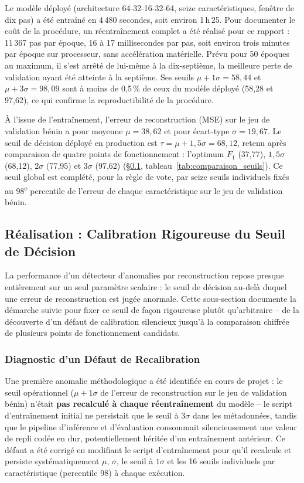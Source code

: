 Le modèle déployé (architecture 64-32-16-32-64, seize caractéristiques, fenêtre de dix pas) a été entraîné en 4\,480 secondes, soit environ 1\,h\,25. Pour documenter le coût de la procédure, un réentraînement complet a été réalisé pour ce rapport : 11\,367 pas par époque, 16 à 17 millisecondes par pas, soit environ trois minutes par époque sur processeur, sans accélération matérielle. Prévu pour 50 époques au maximum, il s'est arrêté de lui-même à la dix-septième, la meilleure perte de validation ayant été atteinte à la septième. Ses seuils $\mu+1\sigma = 58,44$ et $\mu+3\sigma = 98,09$ sont à moins de 0,5\,\% de ceux du modèle déployé (58,28 et 97,62), ce qui confirme la reproductibilité de la procédure.

À l'issue de l'entraînement, l'erreur de reconstruction (MSE) sur le jeu de validation bénin a pour moyenne $\mu = 38,62$ et pour écart-type $\sigma = 19,67$. Le seuil de décision déployé en production est $\tau = \mu + 1,5\sigma = 68,12$, retenu après comparaison de quatre points de fonctionnement : l'optimum $F_1$ (37,77), $1,5\sigma$ (68,12), $2\sigma$ (77,95) et $3\sigma$ (97,62) (\S\ref{subsec:threshold_scaling}, tableau~\ref{tab:comparaison_seuils}). Ce seuil global est complété, pour la règle de vote, par seize seuils individuels fixés au 98\textsuperscript{e} percentile de l'erreur de chaque caractéristique sur le jeu de validation bénin.

\subsection{Réalisation : Calibration Rigoureuse du Seuil de Décision}
\label{subsec:threshold_scaling}
La performance d'un détecteur d'anomalies par reconstruction repose presque entièrement sur un seul paramètre scalaire : le seuil de décision au-delà duquel une erreur de reconstruction est jugée anormale. Cette sous-section documente la démarche suivie pour fixer ce seuil de façon rigoureuse plutôt qu'arbitraire -- de la découverte d'un défaut de calibration silencieux jusqu'à la comparaison chiffrée de plusieurs points de fonctionnement candidats.


\subsubsection{Diagnostic d'un Défaut de Recalibration}
Une première anomalie méthodologique a été identifiée en cours de projet : le seuil opérationnel ($\mu + 1\sigma$ de l'erreur de reconstruction sur le jeu de validation bénin) n'était \textbf{pas recalculé à chaque réentraînement} du modèle -- le script d'entraînement initial ne persistait que le seuil à $3\sigma$ dans les métadonnées, tandis que le pipeline d'inférence et d'évaluation consommait silencieusement une valeur de repli codée en dur, potentiellement héritée d'un entraînement antérieur. Ce défaut a été corrigé en modifiant le script d'entraînement pour qu'il recalcule et persiste systématiquement $\mu$, $\sigma$, le seuil à $1\sigma$ et les 16 seuils individuels par caractéristique (percentile 98) à chaque exécution.

